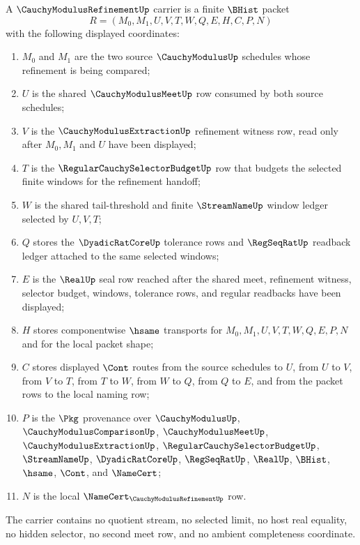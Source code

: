 \begin{definition}
\label{def:cauchy-modulus-refinement-carrier}
A $\CauchyModulusRefinementUp$ carrier is a finite $\BHist$ packet
$$
R=(M_0,M_1,U,V,T,W,Q,E,H,C,P,N)
$$
with the following displayed coordinates:
\begin{enumerate}
\item $M_0$ and $M_1$ are the two source $\CauchyModulusUp$ schedules whose refinement is being compared;
\item $U$ is the shared $\CauchyModulusMeetUp$ row consumed by both source schedules;
\item $V$ is the $\CauchyModulusExtractionUp$ refinement witness row, read only after $M_0,M_1$ and $U$ have been displayed;
\item $T$ is the $\RegularCauchySelectorBudgetUp$ row that budgets the selected finite windows for the refinement handoff;
\item $W$ is the shared tail-threshold and finite $\StreamNameUp$ window ledger selected by $U,V,T$;
\item $Q$ stores the $\DyadicRatCoreUp$ tolerance rows and $\RegSeqRatUp$ readback ledger attached to the same selected windows;
\item $E$ is the $\RealUp$ seal row reached after the shared meet, refinement witness, selector budget, windows, tolerance rows, and regular readbacks have been displayed;
\item $H$ stores componentwise $\hsame$ transports for $M_0,M_1,U,V,T,W,Q,E,P,N$ and for the local packet shape;
\item $C$ stores displayed $\Cont$ routes from the source schedules to $U$, from $U$ to $V$, from $V$ to $T$, from $T$ to $W$, from $W$ to $Q$, from $Q$ to $E$, and from the packet rows to the local naming row;
\item $P$ is the $\Pkg$ provenance over $\CauchyModulusUp$, $\CauchyModulusComparisonUp$, $\CauchyModulusMeetUp$, $\CauchyModulusExtractionUp$, $\RegularCauchySelectorBudgetUp$, $\StreamNameUp$, $\DyadicRatCoreUp$, $\RegSeqRatUp$, $\RealUp$, $\BHist$, $\hsame$, $\Cont$, and $\NameCert$;
\item $N$ is the local $\NameCert_{\CauchyModulusRefinementUp}$ row.
\end{enumerate}
The carrier contains no quotient stream, no selected limit, no host real equality, no hidden selector, no second meet row, and no ambient completeness coordinate.
\end{definition}

